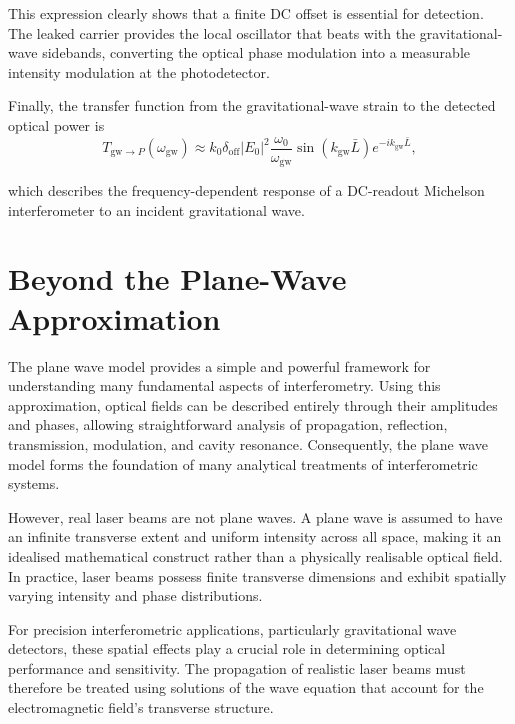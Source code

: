 \documentclass{report}
\begin{document}
This expression clearly shows that a finite DC offset is essential for detection. The leaked carrier provides the local oscillator that beats with the gravitational-wave sidebands, converting the optical phase modulation into a measurable intensity modulation at the photodetector.

Finally, the transfer function from the gravitational-wave strain to the detected optical power is
\begin{equation}
T_{\mathrm{gw}\rightarrow P}(\omega_{\mathrm{gw}})
\approx
k_0\delta_{\mathrm{off}}
|E_0|^2
\frac{\omega_0}{\omega_{\mathrm{gw}}}
\sin(k_{\mathrm{gw}}\bar L)
e^{-ik_{\mathrm{gw}}\bar L},
\end{equation}

which describes the frequency-dependent response of a DC-readout Michelson interferometer to an incident gravitational wave.







\chapter{Beyond the Plane-Wave Approximation}

The plane wave model provides a simple and powerful framework for understanding many fundamental aspects of interferometry. Using this approximation, optical fields can be described entirely through their amplitudes and phases, allowing straightforward analysis of propagation, reflection, transmission, modulation, and cavity resonance. Consequently, the plane wave model forms the foundation of many analytical treatments of interferometric systems.

However, real laser beams are not plane waves. A plane wave is assumed to have an infinite transverse extent and uniform intensity across all space, making it an idealised mathematical construct rather than a physically realisable optical field. In practice, laser beams possess finite transverse dimensions and exhibit spatially varying intensity and phase distributions.

For precision interferometric applications, particularly gravitational wave detectors, these spatial effects play a crucial role in determining optical performance and sensitivity. The propagation of realistic laser beams must therefore be treated using solutions of the wave equation that account for the electromagnetic field's transverse structure.
\end{document}
